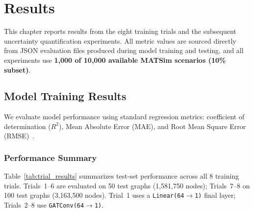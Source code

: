 
\chapter{Results}\label{chapter:results}

This chapter reports results from the eight training trials and the subsequent uncertainty quantification experiments. All metric values are sourced directly from JSON evaluation files produced during model training and testing, and all experiments use \textbf{1,000 of 10,000 available MATSim scenarios (10\% subset)}.

\section{Model Training Results}

We evaluate model performance using standard regression metrics: coefficient of determination ($R^2$), Mean Absolute Error (MAE), and Root Mean Square Error (RMSE)~\cite{chai2014root, nagelkerke1991note}.

\subsection{Performance Summary}

Table~\ref{tab:trial_results} summarizes test-set performance across all 8 training trials. Trials~1--6 are evaluated on 50 test graphs (1,581,750 nodes); Trials~7--8 on 100 test graphs (3,163,500 nodes). Trial~1 uses a \texttt{Linear(64$\to$1)} final layer; Trials~2--8 use \texttt{GATConv(64$\to$1)}.

